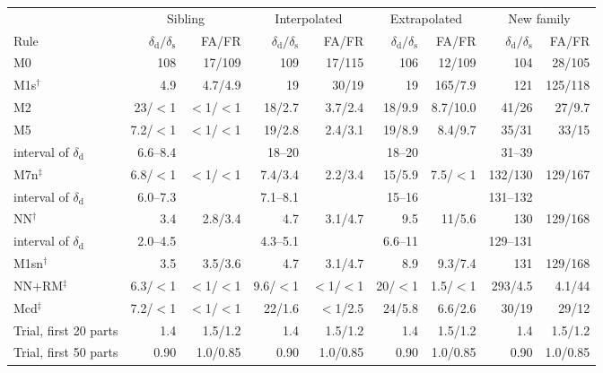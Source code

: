\documentclass[pdflatex,sn-basic,lineno]{sn-jnl}
\providecommand{\DIFaddbeginFL}{} %
\providecommand{\DIFdelendFL}{} %
\newcommand{\DIFaddincludegraphics}[2][]{{\color{blue}\fbox{\DIFOincludegraphics[#1]{#2}}}} %
\DeclareRobustCommand{\DIFaddbeginFL}{\DIFOaddbeginFL \let\includegraphics\DIFaddincludegraphics} %
\DeclareRobustCommand{\DIFdelendFL}{\DIFOaddendFL \let\includegraphics\DIFOincludegraphics} %
\begin{document}
\begin{table}[t]
\DIFdelendFL \DIFaddbeginFL \begin{tabular}{@{}lrrrrrrrr@{}}
\toprule
 & \multicolumn{2}{c}{Sibling} & \multicolumn{2}{c}{Interpolated} & \multicolumn{2}{c}{Extrapolated} & \multicolumn{2}{c}{New family} \\
\cmidrule(lr){2-3}\cmidrule(lr){4-5}\cmidrule(lr){6-7}\cmidrule(lr){8-9}
Rule & $\delta_\mathrm{d}/\delta_\mathrm{s}$ & FA/FR & $\delta_\mathrm{d}/\delta_\mathrm{s}$ & FA/FR & $\delta_\mathrm{d}/\delta_\mathrm{s}$ & FA/FR & $\delta_\mathrm{d}/\delta_\mathrm{s}$ & FA/FR \\
\midrule
M0 & 108 & 17/109 & 109 & 17/115 & 106 & 12/109 & 104 & 28/105 \\
M1s$^\dagger$ & 4.9 & 4.7/4.9 & 19 & 30/19 & 19 & 165/7.9 & 121 & 125/118 \\
M2 & 23/$<$1 & $<$1/$<$1 & 18/2.7 & 3.7/2.4 & 18/9.9 & 8.7/10.0 & 41/26 & 27/9.7 \\
M5 & 7.2/$<$1 & $<$1/$<$1 & 19/2.8 & 2.4/3.1 & 19/8.9 & 8.4/9.7 & 35/31 & 33/15 \\
\quad interval of $\delta_\mathrm{d}$ & 6.6--8.4 &  & 18--20 &  & 18--20 &  & 31--39 & \\
M7n$^\ddagger$ & 6.8/$<$1 & $<$1/$<$1 & 7.4/3.4 & 2.2/3.4 & 15/5.9 & 7.5/$<$1 & 132/130 & 129/167 \\
\quad interval of $\delta_\mathrm{d}$ & 6.0--7.3 &  & 7.1--8.1 &  & 15--16 &  & 131--132 & \\
NN$^\dagger$ & 3.4 & 2.8/3.4 & 4.7 & 3.1/4.7 & 9.5 & 11/5.6 & 130 & 129/168 \\
\quad interval of $\delta_\mathrm{d}$ & 2.0--4.5 &  & 4.3--5.1 &  & 6.6--11 &  & 129--131 & \\
M1sn$^\dagger$ & 3.5 & 3.5/3.6 & 4.7 & 3.1/4.7 & 8.9 & 9.3/7.4 & 131 & 129/168 \\
NN+RM$^\ddagger$ & 6.3/$<$1 & $<$1/$<$1 & 9.6/$<$1 & $<$1/$<$1 & 20/$<$1 & 1.5/$<$1 & 293/4.5 & 4.1/44 \\
Mcd$^\ddagger$ & 7.2/$<$1 & $<$1/$<$1 & 22/1.6 & $<$1/2.5 & 24/5.8 & 6.6/2.6 & 30/19 & 29/12 \\
\midrule Trial, first 20 parts & 1.4 & 1.5/1.2 & 1.4 & 1.5/1.2 & 1.4 & 1.5/1.2 & 1.4 & 1.5/1.2 \\
Trial, first 50 parts & 0.90 & 1.0/0.85 & 0.90 & 1.0/0.85 & 0.90 & 1.0/0.85 & 0.90 & 1.0/0.85 \\

\end{tabular}
\end{table}
\end{document}
